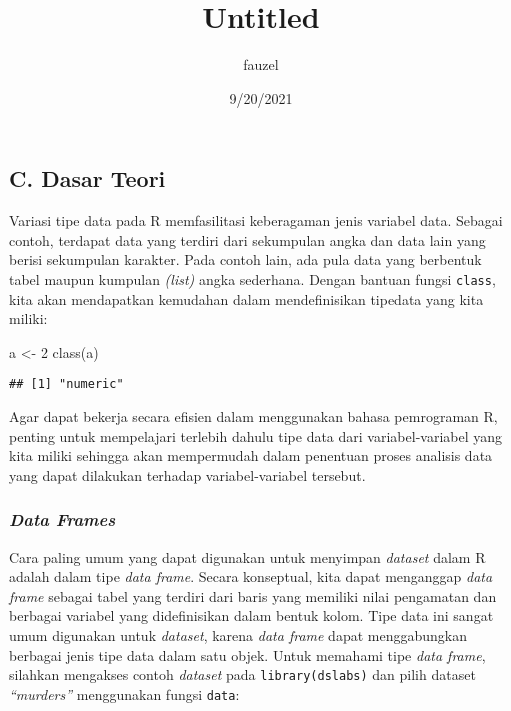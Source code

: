 \documentclass[
]{article}
\title{Untitled}
\author{fauzel}
\date{9/20/2021}
\newenvironment{Shaded}{\begin{snugshade}}{\end{snugshade}}
\newcommand{\DecValTok}[1]{\textcolor[rgb]{0.00,0.00,0.81}{#1}}
\newcommand{\FunctionTok}[1]{\textcolor[rgb]{0.00,0.00,0.00}{#1}}
\newcommand{\NormalTok}[1]{#1}
\newcommand{\OtherTok}[1]{\textcolor[rgb]{0.56,0.35,0.01}{#1}}
\begin{document}
\maketitle

\hypertarget{c.-dasar-teori}{%
\subsection{C. Dasar Teori}\label{c.-dasar-teori}}

Variasi tipe data pada R memfasilitasi keberagaman jenis variabel data.
Sebagai contoh, terdapat data yang terdiri dari sekumpulan angka dan
data lain yang berisi sekumpulan karakter. Pada contoh lain, ada pula
data yang berbentuk tabel maupun kumpulan \emph{(list)} angka sederhana.
Dengan bantuan fungsi \texttt{class}, kita akan mendapatkan kemudahan
dalam mendefinisikan tipedata yang kita miliki:

\begin{Shaded}
\begin{Highlighting}[]
\NormalTok{a }\OtherTok{\textless{}{-}} \DecValTok{2}
\FunctionTok{class}\NormalTok{(a)}
\end{Highlighting}
\end{Shaded}

\begin{verbatim}
## [1] "numeric"
\end{verbatim}

Agar dapat bekerja secara efisien dalam menggunakan bahasa pemrograman
R, penting untuk mempelajari terlebih dahulu tipe data dari
variabel-variabel yang kita miliki sehingga akan mempermudah dalam
penentuan proses analisis data yang dapat dilakukan terhadap
variabel-variabel tersebut.

\hypertarget{data-frames}{%
\subsubsection{\texorpdfstring{\emph{Data
Frames}}{Data Frames}}\label{data-frames}}

Cara paling umum yang dapat digunakan untuk menyimpan \emph{dataset}
dalam R adalah dalam tipe \emph{data frame}. Secara konseptual, kita
dapat menganggap \emph{data frame} sebagai tabel yang terdiri dari baris
yang memiliki nilai pengamatan dan berbagai variabel yang didefinisikan
dalam bentuk kolom. Tipe data ini sangat umum digunakan untuk
\emph{dataset}, karena \emph{data frame} dapat menggabungkan berbagai
jenis tipe data dalam satu objek. Untuk memahami tipe \emph{data frame},
silahkan mengakses contoh \emph{dataset} pada \texttt{library(dslabs)}
dan pilih dataset \emph{``murders''} menggunakan fungsi \texttt{data}:
\end{document}

